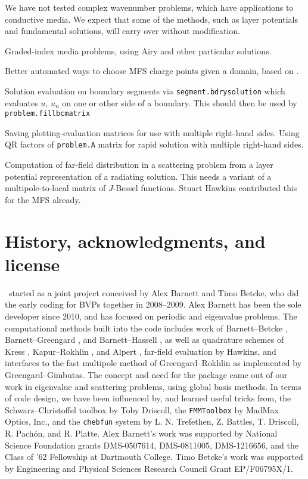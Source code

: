 \documentclass[12pt]{article}
\begin{document}
\item We have not tested complex wavenumber problems, which have
applications to conductive media. We expect that some of the
methods, such as layer potentials and fundamental solutions,
will carry over without modification.

\item Graded-index media problems, using Airy and other particular
solutions.

\item Better automated ways to choose MFS charge points given a domain,
based on \cite{mfs}.

\item Solution evaluation on boundary segments via {\tt segment.bdrysolution}
 which evaluates $u$, $u_n$ on one
or other side of a boundary.
This should then be used by {\tt problem.fillbcmatrix}

\item Saving plotting-evaluation matrices
for use with multiple right-hand sides.
Using QR factors of {\tt problem.A} matrix
for rapid solution with multiple right-hand sides.

\item Computation of far-field distribution in a scattering problem
from a layer potential
representation of a radiating solution. This needs a variant of a
multipole-to-local matrix of $J$-Bessel functions. Stuart Hawkins
contributed this for the MFS already.
\ei


\section{History, acknowledgments, and license}

\mpspack\ started as a joint project conceived by
Alex Barnett and Timo Betcke, who did the early coding for
BVPs together in 2008--2009.
Alex Barnett has been the sole developer since 2010,
and has focused on periodic and eigenvalue problems.
The computational methods built into the code includes
work of Barnett--Betcke \cite{mfs,mush,polygonscatt},
Barnett--Greengard \cite{qplp,qpsc},
and Barnett--Hassell \cite{sca},
as well as quadrature schemes of Kress \cite{coltonkress},
Kapur--Rokhlin \cite{kapur}, and Alpert \cite{alpert},
far-field evaluation by Hawkins,
and interfaces to the fast multipole method of Greengard--Rokhlin
as implemented by Greengard--Gimbutas.
The concept and need for the package came out of our work in eigenvalue
and scattering problems, using global basis methods.
In terms of code design, we
have been influenced by, and learned useful tricks from,
the Schwarz--Christoffel toolbox by Toby Driscoll,
the {\tt FMMToolbox} by MadMax Optics, Inc.,
and the {\tt chebfun} system
by L. N. Trefethen, Z. Battles, T. Driscoll, R. Pach\'{o}n, and R. Platte.
Alex Barnett's work was supported by National Science Foundation
grants DMS-0507614, DMS-0811005, DMS-1216656, and the Class of '62 Fellowship at
Dartmouth College.
Timo Betcke's work was supported
by Engineering and Physical Sciences Research Council Grant EP/F06795X/1.
\end{document}

